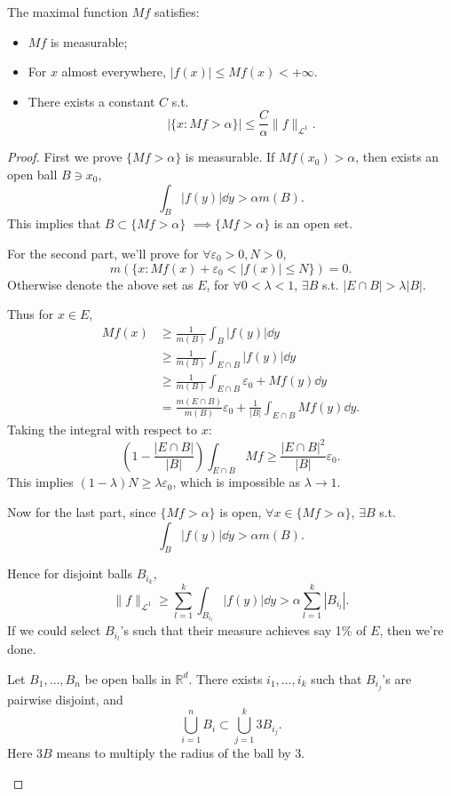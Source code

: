 \begin{theorem}
    The maximal function $Mf$ satisfies:
	\begin{itemize}
		\item $Mf$ is measurable;
		\item For  $x$ almost everywhere,  $|f(x)|\le Mf(x)<+\infty$.

		\item There exists a constant $C$ s.t.
			\[
			\left|\{x: Mf> \alpha\}\right| \le
			\frac{C}{\alpha}\lVert f \rVert _{\mathcal{L}^1}.
			\]
	\end{itemize}
\end{theorem}
\begin{proof}[Proof]
    First we prove $\{Mf>\alpha\}$ is measurable.
	If $Mf(x_0)>\alpha$, then exists an open ball $B\ni x_0$,
	\[
	\int_B |f(y)|\dd y > \alpha m(B).
	\]
	This implies that $B \subset \{Mf>\alpha\}$
	$ \implies \{Mf>\alpha\}$ is an open set.

	For the second part, we'll prove for $\forall \varepsilon_0>0, N>0$,
	\[
	m(\{x: Mf(x)+ \varepsilon_0<|f(x)|\le N\}) = 0.
	\]
	Otherwise denote the above set as $E$,
	for  $\forall 0<\lambda<1$,  $\exists B$
	s.t. $|E\cap B|>\lambda |B|$.

	Thus for $x\in E$,
	\begin{align*}
		Mf(x) &\ge \frac{1}{m(B)}\int_B |f(y)|\dd y\\
		&\ge \frac{1}{m(B)}\int _{E\cap B}|f(y)|\dd y\\
		&\ge \frac{1}{m(B)}\int_{E\cap B} \varepsilon_0+Mf(y)\dd y\\
		&= \frac{m(E\cap B)}{m(B)}\varepsilon_0
		+ \frac{1}{|B|}\int _{E\cap B} Mf(y)\dd y.
	\end{align*}
	Taking the integral with respect to $x$:
	\[
	\left( 1-\frac{|E\cap B|}{|B|} \right)\int_{E\cap B} Mf
	\ge \frac{|E\cap B|^2}{|B|}\varepsilon_0.
	\]
	This implies $(1-\lambda)N \ge \lambda\varepsilon_0$, which is impossible
	as $\lambda\to 1$.

	Now for the last part, since $\{Mf>\alpha\}$ is open,
	$\forall x\in \{Mf>\alpha\}$, $\exists B$ s.t.
	\[
	\int_B |f(y)|\dd y >\alpha m(B).
	\]

	Hence for disjoint balls $B_{i_k}$,
	\[
	\lVert f \rVert _{\mathcal{L}^1}\ge
	\sum_{l=1}^k \int_{B_{i_l}}|f(y)|\dd y > \alpha\sum_{l=1}^k |B_{i_l}|.
	\]
	If we could select $B_{i_l}$'s such that their measure achieves
	say 1\% of $E$, then we're done.

	\begin{lemma}
		Let $B_1,\dots,B_n$ be open balls in $\mathbb{R}^d$.
		There exists $i_1,\dots,i_k$ such that $B_{i_j}$'s are
		pairwise disjoint, and
		\[
		\bigcup_{i=1}^n B_i \subset \bigcup_{j=1}^k 3B_{i_j}.
		\]
		Here $3B$ means to multiply the radius of the ball by 3.
	\end{lemma}
\end{proof}
